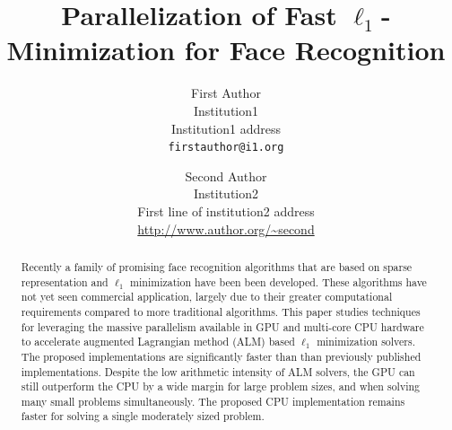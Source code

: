 \documentclass[10pt,twocolumn,letterpaper]{article}
\begin{document}
\title{Parallelization of Fast $\ell_1$-Minimization for Face Recognition}

\author{First Author\\
Institution1\\
Institution1 address\\
{\tt\small firstauthor@i1.org}
\and
Second Author\\
Institution2\\
First line of institution2 address\\
{\small\url{http://www.author.org/~second}}
}

\maketitle

\begin{abstract} Recently a family of promising face recognition algorithms
that are based on sparse representation and $\ell_1$ minimization have been
been developed.  These algorithms have not yet seen commercial application,
largely due to their greater computational requirements compared to more
traditional algorithms.  This paper studies techniques for leveraging the
massive parallelism available in GPU and multi-core CPU hardware to accelerate
augmented Lagrangian method (ALM) based $\ell_1$ minimization solvers.  The
proposed implementations are significantly faster than than previously
published implementations.  Despite the low arithmetic intensity of ALM
solvers, the GPU can still outperform the CPU by a wide margin for large
problem sizes, and when solving many small problems simultaneously.  The
proposed CPU implementation remains faster for solving a single moderately
sized problem.  \end{abstract}
\end{document}
